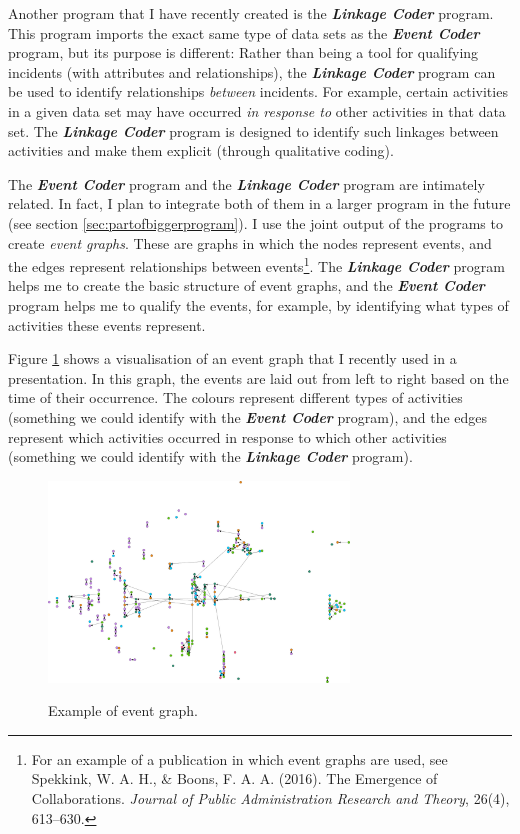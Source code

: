 \documentclass{memoir}
\begin{document}
Another program that I have recently created is the \emph{\textbf{Linkage Coder}} program. This program imports the exact same type of data sets as the \emph{\textbf{Event Coder}} program, but its purpose is different: Rather than being a tool for qualifying incidents (with attributes and relationships), the \textbf{\emph{Linkage Coder}} program can be used to identify relationships \emph{between} incidents. For example, certain activities in a given data set may have occurred \emph{in response to} other activities in that data set. The \emph{\textbf{Linkage Coder}} program is designed to identify such linkages between activities and make them explicit (through qualitative coding).

The \textbf{\emph{Event Coder}} program and the \textbf{\emph{Linkage Coder}} program are intimately related. In fact, I plan to integrate both of them in a larger program in the future (see section \ref{sec:partofbiggerprogram}). I use the joint output of the programs to create \emph{event graphs}. These are graphs in which the nodes represent events, and the edges represent relationships between events\footnote{For an example of a publication in which event graphs are used, see Spekkink, W. A. H., \& Boons, F. A. A. (2016). The Emergence of Collaborations. \emph{Journal of Public Administration Research and Theory}, 26(4), 613–630.}. The \textbf{\emph{Linkage Coder}} program helps me to create the basic structure of event graphs, and the \textbf{\emph{Event Coder}} program helps me to qualify the events, for example, by identifying what types of activities these events represent.

Figure \ref{fig:eventgraph} shows a visualisation of an event graph that I recently used in a presentation. In this graph, the events are laid out from left to right based on the time of their occurrence. The colours represent different types of activities (something we could identify with the \emph{\textbf{Event Coder}} program), and the edges represent which activities occurred in response to which other activities (something we could identify with the \textbf{\emph{Linkage Coder}} program).

\begin{figure}[h!]
  \centering
  \caption{Example of event graph.}
  \includegraphics[width=80mm]{Diagram_6.png}
  \label{fig:eventgraph}
\end{figure}
\end{document}
